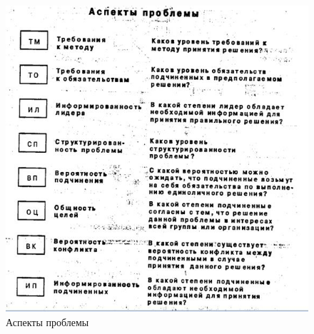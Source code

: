 \documentclass[a4paper,12pt,oneside,final]{extarticle}
\makeatletter
\numberwithin{equation}{section}
\def\maxwidth#1{\ifdim\Gin@nat@width>#1 #1\else\Gin@nat@width\fi}
\makeatother
\begin{document}
\begin{enumerate}
\begin{figure}[h]
	\centering
	\includegraphics[width=\maxwidth{\textwidth}]{management-figures/leadership_vyy_1}
	\caption{Аспекты проблемы}
	\label{leadership_vyy_1}
\end{figure}


\end{enumerate}
\end{document}
